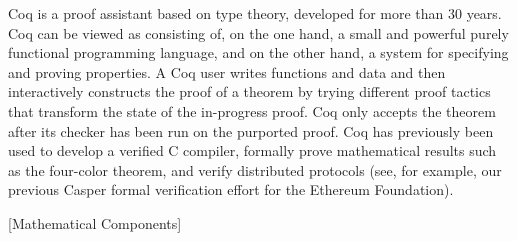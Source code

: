 Coq is a proof assistant based on type theory, developed for more than 30 years. Coq can be viewed as consisting of, on the one hand, a small and powerful purely functional programming language, and on the other hand, a system for specifying and proving properties. A Coq user writes functions and data and then interactively constructs the proof of a theorem by trying different proof tactics that transform the state of the in-progress proof. Coq only accepts the theorem after its checker has been run on the purported proof. Coq has previously been used to develop a verified C compiler, formally prove mathematical results such as the four-color theorem, and verify distributed protocols (see, for example, our previous Casper formal verification effort for the Ethereum Foundation).

[Mathematical Components]

